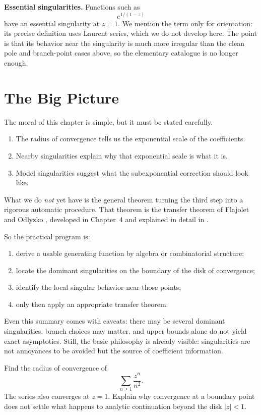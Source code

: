 \textbf{Essential singularities.}
Functions such as
\[
  e^{1/(1-z)}
\]
have an essential singularity at $z=1$. We mention the term only for orientation: its precise definition uses Laurent series, which we do not develop here. The point is that its behavior near the singularity is much more irregular than the clean pole and branch-point cases above, so the elementary catalogue is no longer enough.

\section{The Big Picture}

The moral of this chapter is simple, but it must be stated carefully.

\begin{enumerate}
\item The radius of convergence tells us the exponential scale of the coefficients.
\item Nearby singularities explain why that exponential scale is what it is.
\item Model singularities suggest what the subexponential correction should look like.
\end{enumerate}

What we do \emph{not} yet have is the general theorem turning the third step into a rigorous automatic procedure. That theorem is the transfer theorem of Flajolet and Odlyzko \cite{FlajoletOdlyzko1990}, developed in Chapter~4 and explained in detail in \cite{FlajoletSedgewick2009}.

So the practical program is:
\begin{enumerate}
\item derive a usable generating function by algebra or combinatorial structure;
\item locate the dominant singularities on the boundary of the disk of convergence;
\item identify the local singular behavior near those points;
\item only then apply an appropriate transfer theorem.
\end{enumerate}

Even this summary comes with caveats: there may be several dominant singularities, branch choices may matter, and upper bounds alone do not yield exact asymptotics. Still, the basic philosophy is already visible: singularities are not annoyances to be avoided but the source of coefficient information.

\begin{exercise}
Find the radius of convergence of
\[
  \sum_{n \ge 1} \frac{z^n}{n^2}.
\]
The series also converges at $z=1$. Explain why convergence at a boundary point does not settle what happens to analytic continuation beyond the disk $|z|<1$.
\end{exercise}

